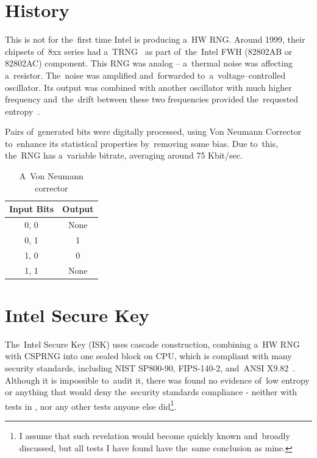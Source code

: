 \section{History}\label{sec:intel-history}
\par{
This is not for the~first time Intel is producing a~HW RNG. Around 1999, 
their chipsets of~8xx series had a~TRNG~\cite[chapter 1.3.5]{Intel810Manual}\cite{RNGTools} 
as part of~the~Intel FWH (82802AB or 82802AC) component.
This RNG was analog -- a~thermal noise was affecting a~resistor. 
The~noise was amplified and~forwarded to~a~voltage--controlled oscillator. 
Its output was combined with another oscillator with much higher frequency 
and~the~drift between these two frequencies provided the~requested entropy~\cite{IntelRNGAnalysis}.
}
\par{
Pairs of~generated bits were digitally processed, using Von Neumann Corrector to~enhance its statistical properties by~removing some bias. Due to~this, the~RNG has a~variable bitrate, averaging around 75 Kbit/sec.
}
\begin{table}[h!]
  \begin{center}
    \begin{tabular}{|c|c|}
      \hline
      Input Bits &  Output\\
      \hline  
      0, 0 & None\\
      0, 1 & 1\\
      1, 0 & 0\\
      1, 1 & None\\
      \hline
    \end{tabular}    \caption{A~Von Neumann corrector}
    \label{fig:VonNeumannCorrector}
  \end{center}
\end{table}
\section{Intel Secure Key}\label{sec:intel-secure-key}
\par{
The~Intel Secure Key (ISK) uses cascade construction, combining a~HW RNG
 with CSPRNG into one sealed block on CPU, which is compliant with many 
 security standards, including NIST SP800-90, FIPS-140-2, and~ANSI 
X9.82~\cite{IntelDRNGGuide}. Although it is impossible to~audit it, there was found 
 no evidence of~low entropy or anything that would deny the~security standards 
 compliance - neither with tests in , nor any other 
 tests anyone else did\footnote{I assume that such revelation would become 
 quickly known and~broadly discussed, but all tests I have found have 
 the~same conclusion as mine.}.
 }

